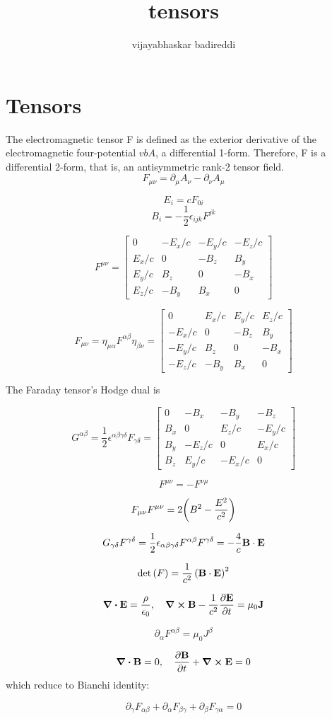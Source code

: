 \documentclass[12pt]{article}
\title{tensors}
\author{vijayabhaskar badireddi}
\date{}
\begin{document}
\section*{Tensors}
The electromagnetic tensor F is defined as the exterior derivative of the electromagnetic four-potential $vb{A}$, a differential 1-form.
Therefore, F is a differential 2-form, that is, an antisymmetric rank-2 tensor field.
\[F_{\mu\nu} = \partial_\mu A_\nu - \partial_\nu A_\mu\]

\[E_{i}=cF_{0i}\]
\[B_{i}=-\frac{1}{2}\epsilon_{ijk}F^{jk}\]

\[ F^{\mu\nu}={\begin{bmatrix}0&-E_{x}/c&-E_{y}/c&-E_{z}/c\\E_{x}/c&0&-B_{z}&B_{y}\\E_{y}/c&B_{z}&0&-B_{x}\\E_{z}/c&-B_{y}&B_{x}&0\end{bmatrix}}\]

\[ F_{\mu \nu }=\eta _{\mu \alpha }F^{\alpha \beta }\eta _{\beta \nu }={\begin{bmatrix}0&E_{x}/c&E_{y}/c&E_{z}/c\\-E_{x}/c&0&-B_{z}&B_{y}\\-E_{y}/c&B_{z}&0&-B_{x}\\-E_{z}/c&-B_{y}&B_{x}&0\end{bmatrix}}\]

The Faraday tensor's Hodge dual is

\[ {G^{\alpha \beta }=\frac {1}{2}\epsilon ^{\alpha \beta \gamma \delta }F_{\gamma \delta }={\begin{bmatrix}0&-B_{x}&-B_{y}&-B_{z}\\B_{x}&0&E_{z}/c&-E_{y}/c\\B_{y}&-E_{z}/c&0&E_{x}/c\\B_{z}&E_{y}/c&-E_{x}/c&0\end{bmatrix}}}\]

\[\tag{anti symmetry} F^{\mu \nu }=-F^{\nu \mu }\]

\[ F_{\mu \nu }F^{\mu \nu }=2\qty(B^{2}-{\frac {E^{2}}{c^{2}}})\]

\[G_{\gamma \delta }F^{\gamma \delta }=\frac {1}{2}\epsilon _{\alpha \beta \gamma \delta }F^{\alpha \beta }F^{\gamma \delta }=-\frac {4}{c}\vb{B}\cdot \vb{E}\]

\[\det \left(F\right)=\frac {1}{c^{2}}\left(\vb{B}\cdot \vb{E}\right)^{2}\]

\[\div{\vb{E}} = \frac{\rho}{\epsilon_0},\quad \curl{\vb{B}} - \frac{1}{c^2} \pdv{\vb{E}}{t} = \mu_0 \vb{J} \]

\[\partial_{\alpha} F^{\alpha\beta} = \mu_0 J^{\beta}\]

\[ \div{\vb{B}} = 0,\quad \pdv{\vb{B}}{t} + \curl{\vb{E}} = 0 \]
which reduce to Bianchi identity:

\[\partial_\gamma F_{ \alpha \beta } + \partial_\alpha F_{ \beta \gamma } + \partial_\beta F_{ \gamma \alpha } = 0 \]
\end{document}
